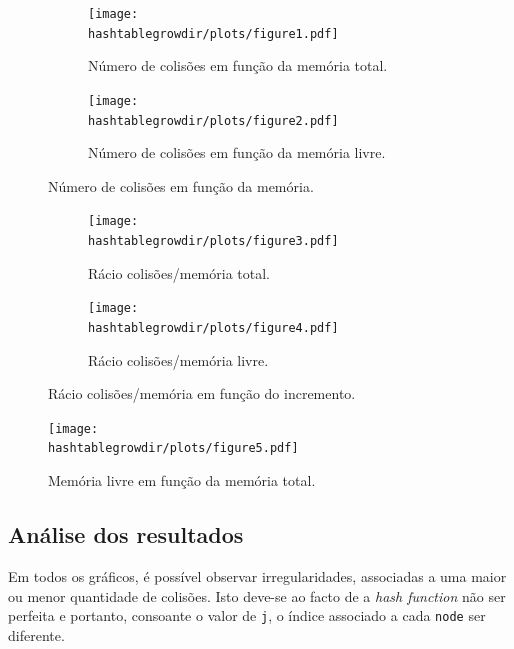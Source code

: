 \documentclass[portuguese,11pt,a4paper,titlepage]{article}
\newcommand{\srcdir}{..}
\newcommand{\hashtablegrowdir}{\srcdir/hash\_table\_grow-test}
\begin{document}
\begin{figure}[h]
	\begin{subfigure}{0.47\textwidth}
		\texttt{[image: \\hashtablegrowdir/plots/figure1.pdf]} 
		\caption{Número de colisões em função da memória total.}
		\label{fig:htg_col_mem_total}
	\end{subfigure}
	\hspace{0.049\textwidth}
	\begin{subfigure}{0.47\textwidth}
		\texttt{[image: \\hashtablegrowdir/plots/figure2.pdf]}
		\caption{Número de colisões em função da memória livre.}
		\label{fig:htg_col_mem_free}
	\end{subfigure}
	
	\caption{Número de colisões em função da memória.}
	\label{fig:htg_col_mem}
\end{figure}

\begin{figure}[h]
	\begin{subfigure}{0.47\textwidth}
		\texttt{[image: \\hashtablegrowdir/plots/figure3.pdf]} 
		\caption{Rácio colisões/memória total.}
		\label{fig:htg_ratio_inc_total}
	\end{subfigure}
	\hspace{0.049\textwidth}
	\begin{subfigure}{0.47\textwidth}
		\texttt{[image: \\hashtablegrowdir/plots/figure4.pdf]}
		\caption{Rácio colisões/memória livre.}
		\label{fig:htg_ratio_inc_free}
	\end{subfigure}
	
	\caption{Rácio colisões/memória em função do incremento.}
	\label{fig:htg_ratio_inc}
\end{figure}

\begin{figure}[ht]
	\centering
	\texttt{[image: \\hashtablegrowdir/plots/figure5.pdf]}
	\caption{Memória livre em função da memória total.}
	\label{fig:htg_free_total}
\end{figure}

\subsection{Análise dos resultados}
Em todos os gráficos, é possível observar irregularidades, associadas a uma maior ou menor quantidade de colisões. Isto deve-se ao facto de a \textit{hash function} não ser perfeita e portanto, consoante o valor de \verb|j|, o índice associado a cada \verb|node| ser diferente.
\end{document}
